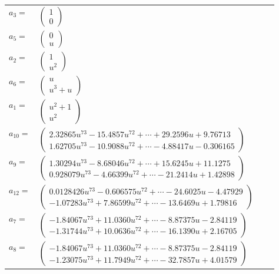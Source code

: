 \documentclass[1p]{elsarticle_modified}
\theoremstyle{definition}
\begin{document}
\begin{tabular}{m{7pt} m{180pt} m{7pt} m{180pt} }
\flushright $a_{3}=$&$\begin{pmatrix}1\\0\end{pmatrix}$ \\
\flushright $a_{5}=$&$\begin{pmatrix}0\\u\end{pmatrix}$ \\
\flushright $a_{2}=$&$\begin{pmatrix}1\\u^2\end{pmatrix}$ \\
\flushright $a_{6}=$&$\begin{pmatrix}u\\u^3+u\end{pmatrix}$ \\
\flushright $a_{1}=$&$\begin{pmatrix}u^2+1\\u^2\end{pmatrix}$ \\
\flushright $a_{10}=$&$\begin{pmatrix}2.32865 u^{73}-15.4857 u^{72}+\cdots+29.2596 u+9.76713\\1.62705 u^{73}-10.9088 u^{72}+\cdots-4.88417 u-0.306165\end{pmatrix}$ \\
\flushright $a_{9}=$&$\begin{pmatrix}1.30294 u^{73}-8.68046 u^{72}+\cdots+15.6245 u+11.1275\\0.928079 u^{73}-4.66399 u^{72}+\cdots-21.2414 u+1.42898\end{pmatrix}$ \\
\flushright $a_{12}=$&$\begin{pmatrix}0.0128426 u^{73}-0.606575 u^{72}+\cdots-24.6025 u-4.47929\\-1.07283 u^{73}+7.86599 u^{72}+\cdots-13.6469 u+1.79816\end{pmatrix}$ \\
\flushright $a_{7}=$&$\begin{pmatrix}-1.84067 u^{73}+11.0360 u^{72}+\cdots-8.87375 u-2.84119\\-1.31744 u^{73}+10.0636 u^{72}+\cdots-16.1390 u+2.16705\end{pmatrix}$ \\
\flushright $a_{8}=$&$\begin{pmatrix}-1.84067 u^{73}+11.0360 u^{72}+\cdots-8.87375 u-2.84119\\-1.23075 u^{73}+11.7949 u^{72}+\cdots-32.7857 u+4.01579\end{pmatrix}$ \\

\end{tabular}
\end{document}
